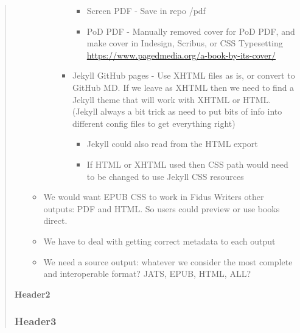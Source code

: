 \documentclass{article}
\begin{document}
\begin{quote}
\begin{itemize}
\begin{itemize}
\begin{itemize}
\begin{itemize}
\begin{itemize}
\item Screen PDF - Save in repo /pdf


\item PoD PDF - Manually removed cover for PoD PDF, and make cover in Indesign, Scribus, or CSS Typesetting \href{https://www.pagedmedia.org/a-book-by-its-cover/}{https://www.pagedmedia.org/a-book-by-its-cover/}


\end{itemize}

\item Jekyll GitHub pages - Use XHTML files as is, or convert to GitHub MD. If we leave as XHTML then we need to find a Jekyll theme that will work with XHTML or HTML.  (Jekyll always a bit trick as need to put bits of info into different config files to get everything right)

\begin{itemize}
\item Jekyll could also read from the HTML export


\item If HTML or XHTML used then CSS path would need to be changed to use Jekyll CSS resources


\end{itemize}

\end{itemize}

\end{itemize}

\item We would want EPUB CSS to work in Fidus Writers other outputs: PDF and HTML. So users could preview or use books direct. 


\item We have to deal with getting correct metadata to each output


\item We need a source output: whatever we consider the most complete and interoperable format? JATS, EPUB, HTML, ALL?


\end{itemize}

\end{itemize}



\textbf{Header2}


\subsubsection{Header3}\label{H6081916}




\end{quote}
\end{document}
